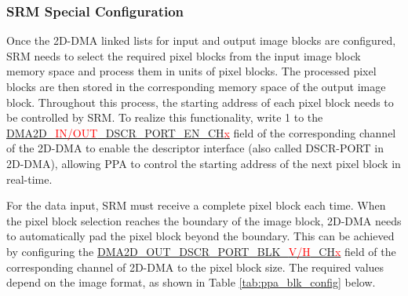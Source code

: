 \documentclass[main\_\_EN.tex]{subfiles}
\begin{document}
\subsubsection{SRM Special Configuration}

Once the 2D-DMA linked lists for input and output image blocks are configured, SRM needs to select the required pixel blocks from the input image block memory space and process them in units of pixel blocks. The processed pixel blocks are then stored in the corresponding memory space of the output image block. Throughout this process, the starting address of each pixel block needs to be controlled by SRM. To realize this functionality, write 1 to the \hyperref[fielddesc:DMA2DINDSCRPORTENCHN]{DMA2D\_\textcolor{red}{IN/OUT}\_DSCR\_PORT\_EN\_CH\textcolor{red}{x}} field of the corresponding channel of the 2D-DMA to enable the descriptor interface (also called DSCR-PORT in 2D-DMA), allowing PPA to control the starting address of the next pixel block in real-time.

For the data input, SRM must receive a complete pixel block each time. When the pixel block selection reaches the boundary of the image block, 2D-DMA needs to automatically pad the pixel block beyond the boundary. This can be achieved by configuring the \hyperref[fielddesc:DMA2DOUTDSCRPORTBLKHCHN]{DMA2D\_OUT\_DSCR\_PORT\_BLK\_\textcolor{red}{V/H}\_CH\textcolor{red}{x}} field of the corresponding channel of 2D-DMA to the pixel block size. The required values depend on the image format, as shown in Table \ref{tab:ppa_blk_config} below.
\end{document}
